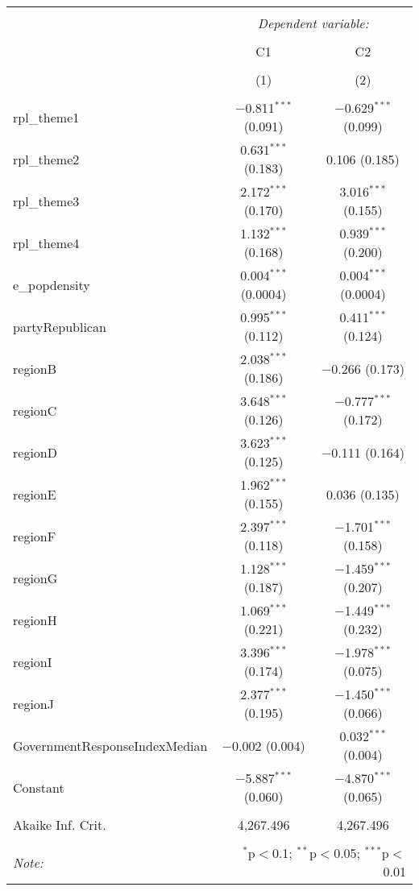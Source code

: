 
\begin{table}[!htbp] \centering 
  \caption{} 
  \label{} 
\begin{tabular}{@{\extracolsep{5pt}}lcc} 
\\[-1.8ex]\hline 
\hline \\[-1.8ex] 
 & \multicolumn{2}{c}{\textit{Dependent variable:}} \\ 
\cline{2-3} 
\\[-1.8ex] & C1 & C2 \\ 
\\[-1.8ex] & (1) & (2)\\ 
\hline \\[-1.8ex] 
 rpl\_theme1 & $-$0.811$^{***}$ (0.091) & $-$0.629$^{***}$ (0.099) \\ 
  rpl\_theme2 & 0.631$^{***}$ (0.183) & 0.106 (0.185) \\ 
  rpl\_theme3 & 2.172$^{***}$ (0.170) & 3.016$^{***}$ (0.155) \\ 
  rpl\_theme4 & 1.132$^{***}$ (0.168) & 0.939$^{***}$ (0.200) \\ 
  e\_popdensity & 0.004$^{***}$ (0.0004) & 0.004$^{***}$ (0.0004) \\ 
  partyRepublican & 0.995$^{***}$ (0.112) & 0.411$^{***}$ (0.124) \\ 
  regionB & 2.038$^{***}$ (0.186) & $-$0.266 (0.173) \\ 
  regionC & 3.648$^{***}$ (0.126) & $-$0.777$^{***}$ (0.172) \\ 
  regionD & 3.623$^{***}$ (0.125) & $-$0.111 (0.164) \\ 
  regionE & 1.962$^{***}$ (0.155) & 0.036 (0.135) \\ 
  regionF & 2.397$^{***}$ (0.118) & $-$1.701$^{***}$ (0.158) \\ 
  regionG & 1.128$^{***}$ (0.187) & $-$1.459$^{***}$ (0.207) \\ 
  regionH & 1.069$^{***}$ (0.221) & $-$1.449$^{***}$ (0.232) \\ 
  regionI & 3.396$^{***}$ (0.174) & $-$1.978$^{***}$ (0.075) \\ 
  regionJ & 2.377$^{***}$ (0.195) & $-$1.450$^{***}$ (0.066) \\ 
  GovernmentResponseIndexMedian & $-$0.002 (0.004) & 0.032$^{***}$ (0.004) \\ 
  Constant & $-$5.887$^{***}$ (0.060) & $-$4.870$^{***}$ (0.065) \\ 
 \hline \\[-1.8ex] 
Akaike Inf. Crit. & 4,267.496 & 4,267.496 \\ 
\hline 
\hline \\[-1.8ex] 
\textit{Note:}  & \multicolumn{2}{r}{$^{*}$p$<$0.1; $^{**}$p$<$0.05; $^{***}$p$<$0.01} \\ 
\end{tabular} 
\end{table} 
